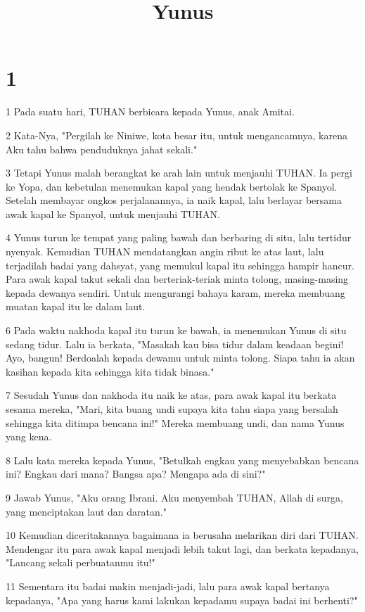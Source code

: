 

\title{Yunus}


\chapter{1}

\par 1 Pada suatu hari, TUHAN berbicara kepada Yunus, anak Amitai.
\par 2 Kata-Nya, "Pergilah ke Niniwe, kota besar itu, untuk mengancamnya, karena Aku tahu bahwa penduduknya jahat sekali."
\par 3 Tetapi Yunus malah berangkat ke arah lain untuk menjauhi TUHAN. Ia pergi ke Yopa, dan kebetulan menemukan kapal yang hendak bertolak ke Spanyol. Setelah membayar ongkos perjalanannya, ia naik kapal, lalu berlayar bersama awak kapal ke Spanyol, untuk menjauhi TUHAN.
\par 4 Yunus turun ke tempat yang paling bawah dan berbaring di situ, lalu tertidur nyenyak. Kemudian TUHAN mendatangkan angin ribut ke atas laut, lalu terjadilah badai yang dahsyat, yang memukul kapal itu sehingga hampir hancur. Para awak kapal takut sekali dan berteriak-teriak minta tolong, masing-masing kepada dewanya sendiri. Untuk mengurangi bahaya karam, mereka membuang muatan kapal itu ke dalam laut.
\par 6 Pada waktu nakhoda kapal itu turun ke bawah, ia menemukan Yunus di situ sedang tidur. Lalu ia berkata, "Masakah kau bisa tidur dalam keadaan begini! Ayo, bangun! Berdoalah kepada dewamu untuk minta tolong. Siapa tahu ia akan kasihan kepada kita sehingga kita tidak binasa."
\par 7 Sesudah Yunus dan nakhoda itu naik ke atas, para awak kapal itu berkata sesama mereka, "Mari, kita buang undi supaya kita tahu siapa yang bersalah sehingga kita ditimpa bencana ini!" Mereka membuang undi, dan nama Yunus yang kena.
\par 8 Lalu kata mereka kepada Yunus, "Betulkah engkau yang menyebabkan bencana ini? Engkau dari mana? Bangsa apa? Mengapa ada di sini?"
\par 9 Jawab Yunus, "Aku orang Ibrani. Aku menyembah TUHAN, Allah di surga, yang menciptakan laut dan daratan."
\par 10 Kemudian diceritakannya bagaimana ia berusaha melarikan diri dari TUHAN. Mendengar itu para awak kapal menjadi lebih takut lagi, dan berkata kepadanya, "Lancang sekali perbuatanmu itu!"
\par 11 Sementara itu badai makin menjadi-jadi, lalu para awak kapal bertanya kepadanya, "Apa yang harus kami lakukan kepadamu supaya badai ini berhenti?"
